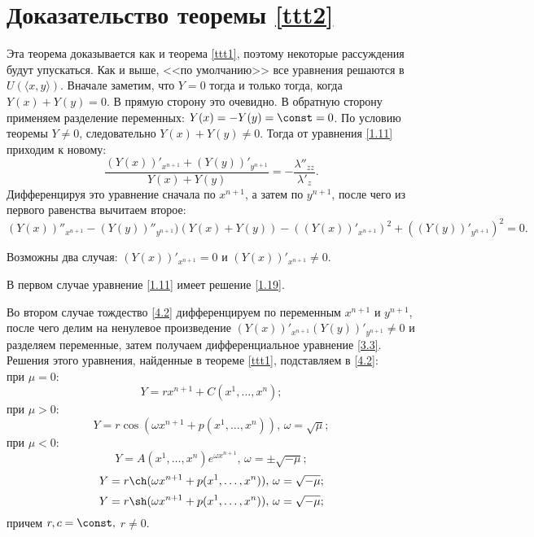 \section{Доказательство теоремы \ref{ttt2}}
Эта теорема доказывается как и теорема \ref{ttt1}, поэтому некоторые рассуждения будут упускаться. Как и выше, <<по умолчанию>> все уравнения решаются в $U(\langle x,y\rangle)$. Вначале заметим, что $Y=0$ тогда и только тогда, когда $Y(x) + Y(y)=0$. В прямую сторону это очевидно. В обратную сторону применяем разделение переменных: $Y(x) = -Y(y)=\const= 0$.
По условию теоремы $Y\ne0$, следовательно $Y(x) + Y(y)\ne0$.
Тогда от уравнения \eqref{1.11} приходим к новому:
\begin{equation}\label{4.1} \dfrac{(Y(x))'_{x^{n+1}} + (Y(y))'_{y^{n+1}}}{Y(x) + Y(y)} = -\dfrac{\lambda''_{zz}}{\lambda'_{z}}. \end{equation} Дифференцируя это уравнение сначала по $x^{n+1}$, а затем по $y^{n+1}$, после чего из первого равенства вычитаем второе:
\begin{equation}\label{4.2} (Y(x))''_{x^{n+1}} - (Y(y))''_{y^{n+1}})(Y(x) + Y(y)) - ((Y(x))'_{x^{n+1}})^2 + ((Y(y))'_{y^{n+1}})^2=0. \end{equation}

Возможны два случая: $(Y(x))'_{x^{n+1}} = 0$ и $(Y(x))'_{x^{n+1}}\ne0$.

В первом случае уравнение \eqref{1.11} имеет решение \eqref{1.19}.

Во втором случае тождество \eqref{4.2} дифференцируем по переменным $x^{n+1}$ и $y^{n+1}$, после чего делим на ненулевое произведение $(Y(x))'_{x^{n+1}}(Y(y))'_{y^{n+1}}\ne0$ и разделяем переменные, затем получаем дифференциальное уравнение \eqref{3.3}. Решения этого уравнения, найденные в теореме \ref{ttt1}, подставляем в \eqref{4.2}:
\\ при $\mu=0$:
\begin{equation}\label{4.3} Y = rx^{n+1} + C(x^1,\ldots,x^n); \end{equation}
при $\mu>0$:
\begin{equation}\label{4.4} Y = r\cos(\omega x^{n+1} + p(x^1,\ldots,x^n)),\,\omega = \sqrt{\mu}; \end{equation}
при $\mu<0$:
\begin{equation}\label{4.5} Y = A(x^1,\ldots,x^n)e^{\omega x^{n+1}},\,\omega = \pm\sqrt{-\mu}; \end{equation}
\begin{equation}\label{4.6} Y = r\ch(\omega x^{n+1} + p(x^1,\ldots,x^n)),\,\omega = \sqrt{-\mu}; \end{equation}
\begin{equation}\label{4.7} Y = r\sh(\omega x^{n+1} + p(x^1,\ldots,x^n)),\,\omega = \sqrt{-\mu}; \end{equation}
причем $r,c = \const,$ $r\ne0$.

